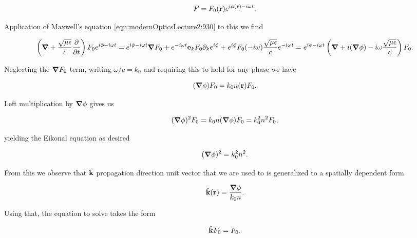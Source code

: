 {\begin{equation}\label{eqn:modernOpticsLecture2:990b}
F = F_0(\mathbf{r}) e^{i \phi(\mathbf{r}) - i\omega t}.
\end{equation}

Application of Maxwell's equation \ref{eqn:modernOpticsLecture2:930} to this we find

\begin{dmath}\label{eqn:modernOpticsLecture2:1010}
\left( \spacegrad + \frac{\sqrt{\mu \epsilon}}{c} \PD{t}{} \right) F_0
e^{i \phi - i\omega t}
=
e^{i \phi - i\omega t} \spacegrad F_0 +
e^{- i\omega t} \Be_k F_0 \partial_k e^{i \phi}
+
e^{i \phi} F_0 (-i\omega) \frac{\sqrt{\mu\epsilon}}{c} e^{-i\omega t}
=
e^{i \phi - i\omega t}
\left(
\spacegrad + i (\spacegrad \phi)
-i\omega \frac{\sqrt{\mu\epsilon}}{c}
\right) F_0.
\end{dmath}

Neglecting the $\boldsymbol{\nabla} F_0$ term, writing $\omega/c = k_0$ and requiring this to hold for any phase we have

\begin{dmath}\label{eqn:modernOpticsLecture2:1030a}
(\spacegrad \phi) F_0 = k_0 n(\Br) F_0.
\end{dmath}

Left multiplication by $\boldsymbol{\nabla} \phi$ gives us

\begin{dmath}\label{eqn:modernOpticsLecture2:1090}
(\spacegrad \phi)^2 F_0 = k_0 n (\spacegrad \phi) F_0 = k_0^2 n^2 F_0,
\end{dmath}

yielding the Eikonal equation as desired

\begin{dmath}\label{eqn:modernOpticsLecture2:1110}
(\spacegrad \phi)^2 = k_0^2 n^2.
\end{dmath}

From this we observe that $\hat{\mathbf{k}}$ propagation direction unit vector that we are used to is generalized to a spatially dependent form

\begin{dmath}\label{eqn:modernOpticsLecture2:1130a}
\kcap(\Br) = \frac{\spacegrad \phi}{k_0 n}.
\end{dmath}

Using that, the equation to solve takes the form

\begin{dmath}\label{eqn:modernOpticsLecture2:1030b}
\kcap F_0 = F_0.
\end{dmath}

}
